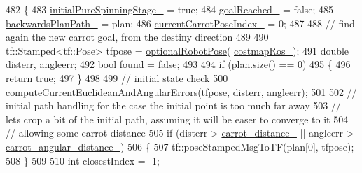 \begin{DoxyCode}
482         \{
483             \hyperlink{classcl__move__base__z_1_1backward__local__planner_1_1BackwardLocalPlanner_aa0e2b0589fce0bb228eb87751528e822}{initialPureSpinningStage\_} = \textcolor{keyword}{true};
484             \hyperlink{classcl__move__base__z_1_1backward__local__planner_1_1BackwardLocalPlanner_ad443c52ef585a8eab0364f0909222f51}{goalReached\_} = \textcolor{keyword}{false};
485             \hyperlink{classcl__move__base__z_1_1backward__local__planner_1_1BackwardLocalPlanner_ad9cde5c85f782cab2ddb4030e3c3f2cf}{backwardsPlanPath\_} = plan;
486             \hyperlink{classcl__move__base__z_1_1backward__local__planner_1_1BackwardLocalPlanner_a2e8f2b78bc97f27c5fa431f3af2261ed}{currentCarrotPoseIndex\_} = 0;
487 
488             \textcolor{comment}{// find again the new carrot goal, from the destiny direction}
489 
490             tf::Stamped<tf::Pose> tfpose = \hyperlink{namespacecl__move__base__z_1_1backward__local__planner_afd5bb2a0d144f7b89f4215fbcb1fbe69}{optionalRobotPose}(
      \hyperlink{classcl__move__base__z_1_1backward__local__planner_1_1BackwardLocalPlanner_a4136268882a105d9e06e173d85d5c0dc}{costmapRos\_});
491             \textcolor{keywordtype}{double} disterr, angleerr;
492             \textcolor{keywordtype}{bool} found = \textcolor{keyword}{false};
493 
494             \textcolor{keywordflow}{if} (plan.size() == 0)
495             \{
496                 \textcolor{keywordflow}{return} \textcolor{keyword}{true};
497             \}
498 
499             \textcolor{comment}{// initial state check}
500             \hyperlink{classcl__move__base__z_1_1backward__local__planner_1_1BackwardLocalPlanner_a843f030138afe0a28cf11a729fa67383}{computeCurrentEuclideanAndAngularErrors}(tfpose, disterr,
       angleerr);
501 
502             \textcolor{comment}{// initial path handling for the case the initial point is too much far away}
503             \textcolor{comment}{// lets crop a bit of the initial path, assuming it will be easer to converge to it}
504             \textcolor{comment}{// allowing some carrot distance}
505             \textcolor{keywordflow}{if} (disterr > \hyperlink{classcl__move__base__z_1_1backward__local__planner_1_1BackwardLocalPlanner_a0bbb80ce5bae865c4322869422803296}{carrot\_distance\_} || angleerr > 
      \hyperlink{classcl__move__base__z_1_1backward__local__planner_1_1BackwardLocalPlanner_a63e30befa09c4a67cf55086923b760c7}{carrot\_angular\_distance\_})
506             \{
507                 tf::poseStampedMsgToTF(plan[0], tfpose);
508             \}
509 
510             \textcolor{keywordtype}{int} closestIndex = -1;

\end{DoxyCode}
